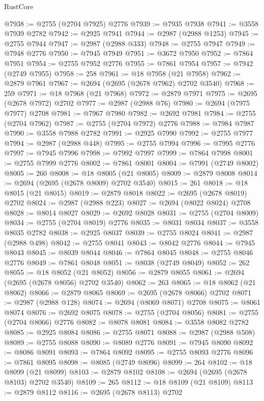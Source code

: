 \begin{lexlean}{RustCore}
\begin{coremodule}
@7938 := @2755 (@2704 @7925) @2776
@7939 := @7935 @7938
@7941 := @3558 @7939 @2782
@7942 := @2925 @7941
@7944 := @2987 (@2988 @1253)
@7945 := @2755 @7944
@7947 := @2987 (@2988 @333)
@7948 := @2755 @7947
@7949 := @7948 @2776
@7950 := @7945 @7949
@7951 := @3672 @7950
@7952 := @7864 @7951
@7954 := @2755 @7952 @2776
@7955 := @7861 @7954
@7957 := @7942 (@2749 @7955)
@7958 := 258
@7961 := @18 @7958 (@21 @7958)
@7962 := @2879 @7961
@7967 := @2694 (@2695 (@2678 @7962) @2702 @3540)
@7968 := 259
@7971 := @18 @7968 (@21 @7968)
@7972 := @2879 @7971
@7975 := @2695 (@2678 @7972) @2702
@7977 := @2987 (@2988 @76)
@7980 := @2694 (@7975 @7977) @2708
@7981 := @7967 @7980
@7982 := @2692 @7981
@7984 := @2755 (@2704 @7962)
@7987 := @2755 (@2704 @7972) @2776
@7988 := @7984 @7987
@7990 := @3558 @7988 @2782
@7991 := @2925 @7990
@7992 := @2755 @7977
@7994 := @2987 (@2988 @448)
@7995 := @2755 @7994
@7996 := @7995 @2776
@7997 := @7945 @7996
@7998 := @7992 @7997
@7999 := @7864 @7998
@8001 := @2755 @7999 @2776
@8002 := @7861 @8001
@8004 := @7991 (@2749 @8002)
@8005 := 260
@8008 := @18 @8005 (@21 @8005)
@8009 := @2879 @8008
@8014 := @2694 (@2695 (@2678 @8009) @2702 @3540)
@8015 := 261
@8018 := @18 @8015 (@21 @8015)
@8019 := @2879 @8018
@8022 := @2695 (@2678 @8019) @2702
@8024 := @2987 (@2988 @223)
@8027 := @2694 (@8022 @8024) @2708
@8028 := @8014 @8027
@8029 := @2692 @8028
@8031 := @2755 (@2704 @8009)
@8034 := @2755 (@2704 @8019) @2776
@8035 := @8031 @8034
@8037 := @3558 @8035 @2782
@8038 := @2925 @8037
@8039 := @2755 @8024
@8041 := @2987 (@2988 @498)
@8042 := @2755 @8041
@8043 := @8042 @2776
@8044 := @7945 @8043
@8045 := @8039 @8044
@8046 := @7864 @8045
@8048 := @2755 @8046 @2776
@8049 := @7861 @8048
@8051 := @8038 (@2749 @8049)
@8052 := 262
@8055 := @18 @8052 (@21 @8052)
@8056 := @2879 @8055
@8061 := @2694 (@2695 (@2678 @8056) @2702 @3540)
@8062 := 263
@8065 := @18 @8062 (@21 @8062)
@8066 := @2879 @8065
@8069 := @2695 (@2678 @8066) @2702
@8071 := @2987 (@2988 @128)
@8074 := @2694 (@8069 @8071) @2708
@8075 := @8061 @8074
@8076 := @2692 @8075
@8078 := @2755 (@2704 @8056)
@8081 := @2755 (@2704 @8066) @2776
@8082 := @8078 @8081
@8084 := @3558 @8082 @2782
@8085 := @2925 @8084
@8086 := @2755 @8071
@8088 := @2987 (@2988 @508)
@8089 := @2755 @8088
@8090 := @8089 @2776
@8091 := @7945 @8090
@8092 := @8086 @8091
@8093 := @7864 @8092
@8095 := @2755 @8093 @2776
@8096 := @7861 @8095
@8098 := @8085 (@2749 @8096)
@8099 := 264
@8102 := @18 @8099 (@21 @8099)
@8103 := @2879 @8102
@8108 := @2694 (@2695 (@2678 @8103) @2702 @3540)
@8109 := 265
@8112 := @18 @8109 (@21 @8109)
@8113 := @2879 @8112
@8116 := @2695 (@2678 @8113) @2702

\end{coremodule}
\end{lexlean}
